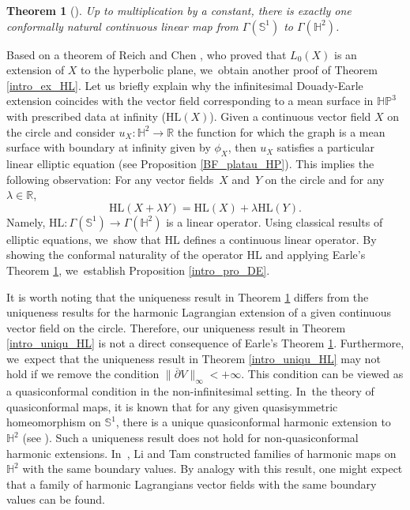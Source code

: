 \documentclass[JEP,XML,SOM,Unicode,NoEqCountersInSection, NoFloatCountersInSection,published]{cedram}
\theoremstyle{plain}
\newtheorem{theorem}[cor]{Theorem}
\theoremstyle{definition}
\newcommand{\HP}{\mathbb{HP}^3}
\begin{document}
\begin{theorem}[\cite{Uniqueness_of_operator_L}]\label{intro_earle_unique}
Up to multiplication by a constant, there is exactly one conformally natural continuous linear map from \(\Gamma(\mathbb{S}^1)\) to \(\Gamma(\mathbb{H}^2)\).
\end{theorem}

Based on a theorem of Reich and Chen \cite{Extension_with_bounded_derivative}, who proved that \(L_0(X) \) is an extension of \(X \) to the hyperbolic plane, we~obtain another proof of Theorem \ref{intro_ex_HL}. Let us briefly explain why the infinitesimal Douady-Earle extension coincides with the vector field corresponding to a mean surface in \(\HP\) with prescribed data at infinity (\ie $\mathrm{HL}(X)$). Given a continuous vector field \(X \) on the circle and consider \(u_X: \mathbb{H}^2 \to \mathbb{R} \) the function for which the graph is a mean surface with boundary at infinity given by \(\phi_X\), then \(u_X \) satisfies a particular linear elliptic equation (see Proposition \ref{BF_platau_HP}). This implies the following observation: For any vector fields~\(X \) and~\(Y \) on the circle and for any \(\lambda \in \mathbb{R}\),
\[
\mathrm{HL}(X + \lambda Y) = \mathrm{HL}(X) + \lambda \mathrm{HL}(Y).
\]
Namely, \(\mathrm{HL}: \Gamma(\mathbb{S}^1) \to \Gamma(\mathbb{H}^2)\) is
a linear operator. Using classical results of elliptic equations, we~show
that \(\mathrm{HL}\) defines a continuous linear operator. By showing the
conformal naturality of the operator \(\mathrm{HL}\) and applying Earle's
Theorem \ref{intro_earle_unique}, we~establish Proposition
\ref{intro_pro_DE}.

It is worth noting that the uniqueness result in Theorem \ref{intro_earle_unique} differs from the uniqueness results for the harmonic Lagrangian extension of a given continuous vector field on the circle. Therefore, our uniqueness result in Theorem \ref{intro_uniqu_HL} is not a direct consequence of Earle's Theorem \ref{intro_earle_unique}. Furthermore, we~expect that the uniqueness result in Theorem \ref{intro_uniqu_HL} may not hold if we remove the condition \(\lVert \overline{\partial} V \rVert_{\infty} < +\infty\). This condition can be viewed as a quasiconformal condition in the non-infinitesimal setting. In~the theory of quasiconformal maps, it is known that for any given quasisymmetric homeomorphism on \(\mathbb{S}^1\), there is a unique quasiconformal harmonic extension to \(\mathbb{H}^2\) (see \cite{LI_Tam1, Schoen_conjecture}). Such a uniqueness result does not hold for non-quasiconformal harmonic extensions. In~\cite{LI_Tam1, Li_Tam2}, Li and Tam constructed families of harmonic maps on \(\mathbb{H}^2\) with the same boundary values. By analogy with this result, one might expect that a family of harmonic Lagrangians vector fields with the same boundary values can be found.
\end{document}
